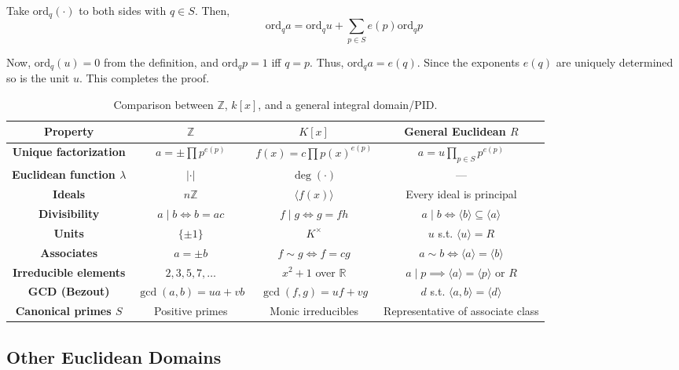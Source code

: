 \documentclass{template}
\begin{document}
Take $\text{ord}_q(\cdot)$ to both sides with $q \in S$. Then,
\begin{equation*}
    \text{ord}_qa = \text{ord}_qu + \sum_{p \in S}e(p)\text{ord}_qp
\end{equation*}

Now, $\text{ord}_q(u)=0$ from the definition, and $\text{ord}_qp = 1$ iff $q=p$.
Thus, $\text{ord}_qa = e(q)$. Since the exponents $e(q)$ are uniquely determined
so is the unit $u$. This completes the proof.

\begin{table}
\centering
\begin{tabular}{cccc}
\hline
\textbf{Property} & $\mathbb{Z}$ & $K[x]$ & \textbf{General Euclidean $R$} \\
\hline
\textbf{Unique factorization} & $a=\pm\prod p^{e(p)}$ & $f(x)=c\prod p(x)^{e(p)}$ & $a=u\prod_{p \in S}p^{e(p)}$ \\
\hline
\textbf{Euclidean function $\lambda$} & $|\cdot|$ & $\deg(\cdot)$ & --- \\
\hline
\textbf{Ideals} & $n\mathbb{Z}$ & $\langle f(x) \rangle$ & Every ideal is principal \\
\hline
\textbf{Divisibility} & $a \mid b \iff b=ac$ & $f \mid g \iff g=fh$ & $a \mid b \iff \langle b \rangle \subseteq \langle a \rangle$ \\
\hline
\textbf{Units} & $\{\pm 1\}$ & $K^{\times}$ & $u$ s.t. $\langle u \rangle = R$ \\
\hline
\textbf{Associates} & $a = \pm b$ & $f \sim g \iff f=cg$ & $a \sim b \iff \langle a \rangle = \langle b \rangle$ \\
\hline
\textbf{Irreducible elements} & $2,3,5,7,\dots$ & $x^2+1$ over $\mathbb{R}$ & $a \mid p \implies \langle a \rangle = \langle p \rangle$ or $R$ \\
\hline
\textbf{GCD (Bezout)} & $\gcd(a,b)=ua+vb$ & $\gcd(f,g)=uf+vg$ & $d$ s.t. $\langle a,b \rangle = \langle d \rangle$ \\
\hline
\textbf{Canonical primes $S$} & Positive primes & Monic irreducibles & Representative of associate class \\
\hline
\end{tabular}
\caption{Comparison between $\mathbb{Z}$, $k[x]$, and a general integral domain/PID.}
\end{table}

\subsection{Other Euclidean Domains}
\end{document}
